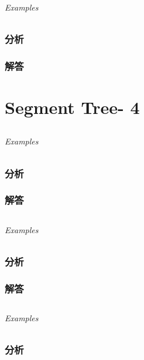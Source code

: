 \documentclass[UTF8,a4paper,12pt]{ctexbook}
\begin{document}
	\subparagraph{Examples}
	
	\subsection{分析}
	
	\subsection{解答}
	
\chapter{Segment Tree- 4}
\section{}
	
	\subparagraph{Examples}
	
	\subsection{分析}
	
	\subsection{解答}
	
\section{}
	
	\subparagraph{Examples}
	
	\subsection{分析}
	
	\subsection{解答}
	
\section{}
	
	\subparagraph{Examples}
	
	\subsection{分析}
	
\end{document}
